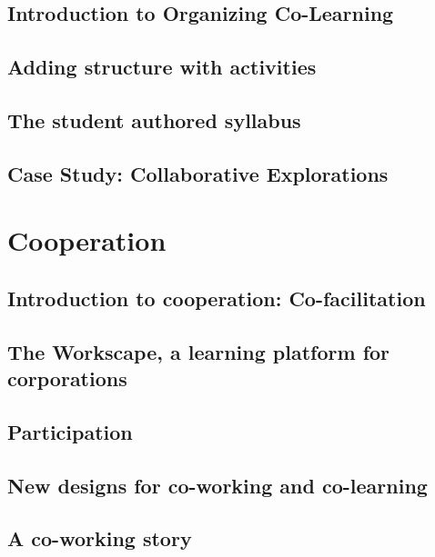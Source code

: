 \documentclass[ebook, 12pt, twoside]{memoir}
\begin{document}
\chapter[\textbf{Organizing Co-Learning}]{Introduction to Organizing Co-Learning}

%
\chapter[\textbf{Adding structure}]{Adding structure with activities}
%

%
\chapter[\textbf{The student authored syllabus}]{ The student authored syllabus } 
%

%
\chapter[\textbf{Case Study: Collaborative Explorations}]{ Case Study: Collaborative Explorations}
%


\part{Cooperation} \label{cooperation-part} %
%
\chapter[\textbf{Co-facilitation}]{Introduction to cooperation: Co-facilitation}

%
\chapter[\textbf{The Workscape}]{ The Workscape, a learning platform for corporations }
%

\chapter[\textbf{Participation}]{ Participation }
%

%
\chapter[\textbf{Designs for co-working}]{New designs for co-working and co-learning}
%

%
\chapter[\textbf{A co-working story}]{A co-working story}
%

\end{document}
